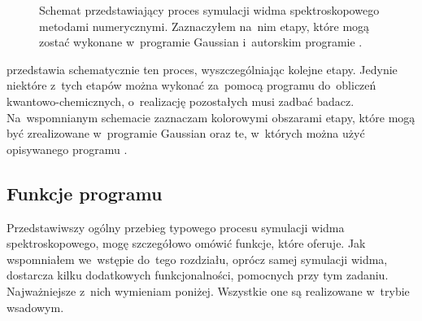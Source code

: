 \begin{figure}
  
  \caption{
    Schemat przedstawiający proces symulacji widma spektroskopowego metodami numerycznymi.
    Zaznaczyłem na~nim etapy, które mogą zostać wykonane w~programie Gaussian i~autorskim
      programie \tesliper{}.
  }\label{fig:simulation-flow}
\end{figure}

 przedstawia schematycznie ten proces, wyszczególniając kolejne etapy.
Jedynie niektóre z~tych etapów można wykonać za~pomocą programu do~obliczeń kwantowo-chemicznych,
  o~realizację pozostałych musi zadbać badacz.
Na~wspomnianym schemacie zaznaczam kolorowymi obszarami etapy, które mogą być zrealizowane
  w~programie Gaussian oraz te, w~których można użyć opisywanego programu \tesliper{}.

\subsection{Funkcje programu}\label{essence:features}
Przedstawiwszy ogólny przebieg typowego procesu symulacji widma spektroskopowego,
  mogę szczegółowo omówić funkcje, które \tesliper{} oferuje.
Jak wspomniałem we~wstępie do~tego rozdziału, oprócz samej symulacji widma, \tesliper{}
  dostarcza kilku dodatkowych funkcjonalności, pomocnych przy tym zadaniu.
Najważniejsze z~nich wymieniam poniżej.
Wszystkie one są realizowane w~trybie wsadowym.  

